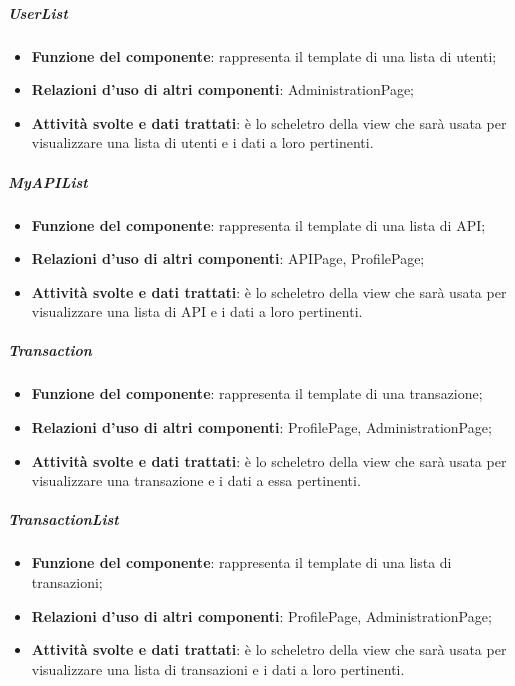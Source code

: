 \subparagraph{UserList}
\begin{itemize}
	\item \textbf{Funzione del componente}: rappresenta il template di una lista di utenti;
	\item \textbf{Relazioni d’uso di altri componenti}: AdministrationPage;
	\item \textbf{Attività svolte e dati trattati}: \`{e} lo scheletro della view che sar\`{a} usata per visualizzare una lista di utenti e i dati a loro pertinenti.
\end{itemize}

\subparagraph{MyAPIList}
\begin{itemize}
	\item \textbf{Funzione del componente}: rappresenta il template di una lista di API;
	\item \textbf{Relazioni d’uso di altri componenti}: APIPage, ProfilePage;
	\item \textbf{Attività svolte e dati trattati}: \`{e} lo scheletro della view che sar\`{a} usata per visualizzare una lista di API e i dati a loro pertinenti.
\end{itemize}

\subparagraph{Transaction}
\begin{itemize}
	\item \textbf{Funzione del componente}: rappresenta il template di una transazione;
	\item \textbf{Relazioni d’uso di altri componenti}: ProfilePage, AdministrationPage;
	\item \textbf{Attività svolte e dati trattati}: \`{e} lo scheletro della view che sar\`{a} usata per visualizzare una transazione e i dati a essa pertinenti.
\end{itemize}

\subparagraph{TransactionList}
\begin{itemize}
	\item \textbf{Funzione del componente}: rappresenta il template di una lista di transazioni;
	\item \textbf{Relazioni d’uso di altri componenti}: ProfilePage, AdministrationPage;
	\item \textbf{Attività svolte e dati trattati}: \`{e} lo scheletro della view che sar\`{a} usata per visualizzare una lista di transazioni e i dati a loro pertinenti.
\end{itemize}

